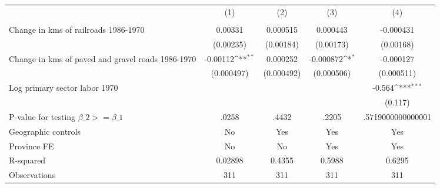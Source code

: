 {
\def\sym#1{\ifmmode^{#1}\else\(^{#1}\)\fi}
\begin{tabular}{l*{4}{c}}
\hline\hline
                &\multicolumn{1}{c}{(1)}&\multicolumn{1}{c}{(2)}&\multicolumn{1}{c}{(3)}&\multicolumn{1}{c}{(4)}\\
                &\multicolumn{1}{c}{}&\multicolumn{1}{c}{}&\multicolumn{1}{c}{}&\multicolumn{1}{c}{}\\
\hline
Change in kms of railroads 1986-1970&  0.00331         & 0.000515         & 0.000443         &-0.000431         \\
                &(0.00235)         &(0.00184)         &(0.00173)         &(0.00168)         \\
[1em]
Change in kms of paved and gravel roads 1986-1970& -0.00112\sym{**} & 0.000252         &-0.000872\sym{*}  &-0.000127         \\
                &(0.000497)         &(0.000492)         &(0.000506)         &(0.000511)         \\
[1em]
Log primary sector labor 1970&                  &                  &                  &   -0.564\sym{***}\\
                &                  &                  &                  &  (0.117)         \\
\hline
P-value for testing $\beta\_{2} >= \beta\_{1}$&    .0258         &    .4432         &    .2205         &.5719000000000001         \\
Geographic controls&       No         &      Yes         &      Yes         &      Yes         \\
Province FE     &       No         &       No         &      Yes         &      Yes         \\
R-squared       &  0.02898         &   0.4355         &   0.5988         &   0.6295         \\
Observations    &      311         &      311         &      311         &      311         \\
\hline\hline
\end{tabular}
}
